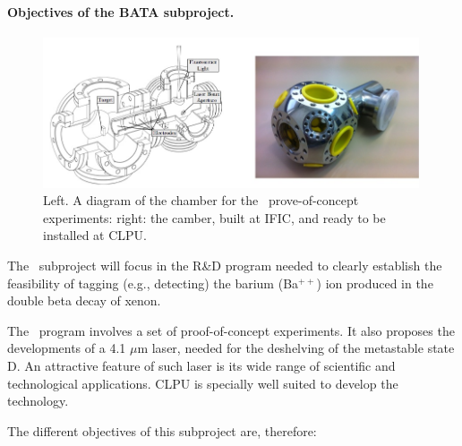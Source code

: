 \paragraph{Objectives of the BATA subproject.}

\begin{figure}
\begin{center}
\includegraphics[width=0.99\textwidth]{img/BChamber.jpg}
\caption{\small Left. A diagram of the chamber for the \BATA\ prove-of-concept experiments: right: the camber, built at IFIC, and ready to be installed at CLPU.}
\label{fig:chamber}
\end{center}
\end{figure}

The \BATA\ subproject will focus in the R\&D program needed to clearly establish the feasibility of tagging (e.g., detecting) the barium (Ba$^{++}$) ion produced in the double beta decay of xenon. 

The \BATA\ program involves a set of proof-of-concept experiments. It also proposes the developments of a 4.1 $\mu$m laser, needed for the deshelving of the metastable state D. An attractive feature of such laser is its wide range of scientific and technological applications. CLPU is specially well suited to develop the technology.

The different objectives of this subproject are, therefore:

